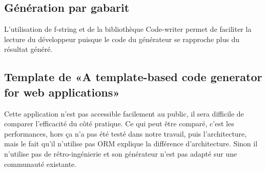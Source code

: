 




\subsection{Génération par gabarit}

L’utilisation de f-string et de la bibliothèque Code-writer permet de faciliter la lecture du développeur puisque le code du générateur se rapproche plus du résultat généré.

\subsection{Template de «A template-based code generator for web applications»}
Cette application n’est pas accessible facilement au public, il sera difficile de comparer l’efficacité du côté pratique. Ce qui peut être comparé, c’est les performances, hors ça n’a pas été testé dans notre travail, puis l’architecture, mais le fait qu’il n’utilise pas ORM explique la différence d’architecture. Sinon il n’utilise pas de rétro-ingénierie et son générateur n’est pas adapté sur une communauté existante.